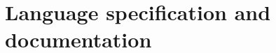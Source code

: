 \documentclass[12pt]{report}
\begin{document}
\part{Language specification and documentation}



\end{document}
